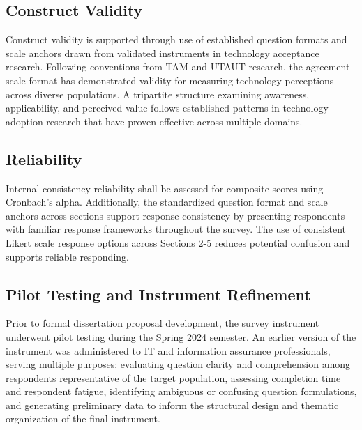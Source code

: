 \subsection{Construct Validity}

Construct validity is supported through use of established question formats and scale anchors drawn from validated instruments in technology acceptance research. Following conventions from TAM and UTAUT research, the agreement scale format has demonstrated validity for measuring technology perceptions across diverse populations. A tripartite structure examining awareness, applicability, and perceived value follows established patterns in technology adoption research that have proven effective across multiple domains.

\subsection{Reliability}

Internal consistency reliability shall be assessed for composite scores using Cronbach's alpha. Additionally, the standardized question format and scale anchors across sections support response consistency by presenting respondents with familiar response frameworks throughout the survey. The use of consistent Likert scale response options across Sections 2-5 reduces potential confusion and supports reliable responding.

\subsection{Pilot Testing and Instrument Refinement}

Prior to formal dissertation proposal development, the survey instrument underwent pilot testing during the Spring 2024 semester. An earlier version of the instrument was administered to IT and information assurance professionals, serving multiple purposes: evaluating question clarity and comprehension among respondents representative of the target population, assessing completion time and respondent fatigue, identifying ambiguous or confusing question formulations, and generating preliminary data to inform the structural design and thematic organization of the final instrument.

